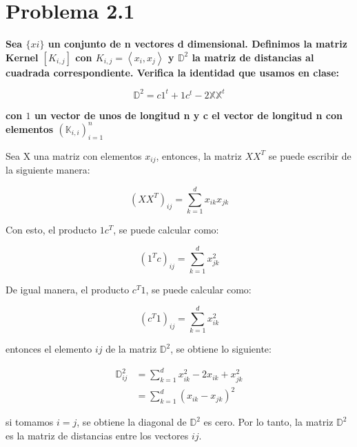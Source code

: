 \section*{Problema 2.1}

\textbf{Sea $\{x i \}$ un conjunto de n vectores d dimensional. Definimos la matriz Kernel $[K_{i,j}]$ con $K_{i,j} = \left\langle x_i , x_j \right\rangle$ y $\mathbb{D}^2$ la matriz de distancias al cuadrada correspondiente. Verifica la identidad que usamos en clase:}

\begin{equation*}
    \mathbb{D}^2 = c1^t+1c^t-2\mathbb{X}\mathbb{X}^t
\end{equation*}

\textbf{con $1$ un vector de unos de longitud n y c el vector de longitud n con elementos $(\mathbb{K}_{i,i})^n_{i=1}$}

Sea X una matriz con elementos $x_{ij}$, entonces, la matriz $XX^T$ se puede escribir de la siguiente manera:

\begin{equation*}
    (XX^T)_{ij} = \sum_{k=1}^d x_{ik}x_{jk}
\end{equation*}

Con esto, el producto $1c^T$, se puede calcular como:

\begin{equation*}
    (1^Tc)_{ij} = \sum_{k=1}^d x_{jk}^2
\end{equation*}

De igual manera, el producto $c^T1$, se puede calcular como:

\begin{equation*}
    (c^T1)_{ij} = \sum_{k=1}^d x_{ik}^2
\end{equation*}

entonces el elemento $ij$ de la matriz $\mathbb{D}^2$, se obtiene lo siguiente:

\begin{align*}
    \mathbb{D}^2_{ij} & = \sum_{k=1}^d x_{ik}^2 - 2x_{ik} +x_{jk}^2 \\
                      & = \sum_{k=1}^d (x_{ik}-x_{jk})^2
\end{align*}

si tomamos $i=j$, se obtiene la diagonal de $\mathbb{D}^2$ es cero. Por lo tanto, la matriz $\mathbb{D}^2$ es la matriz de distancias entre los vectores $ij$.